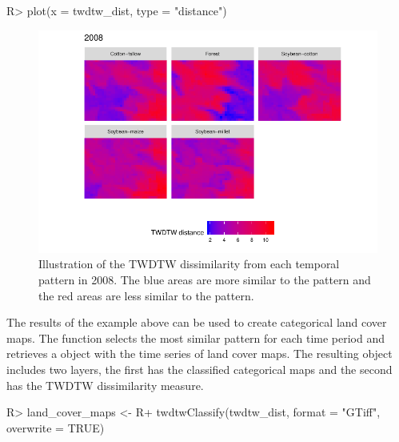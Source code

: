 \documentclass[article,shortnames]{jss}
\begin{document}
\begin{CodeChunk}

\begin{CodeInput}
R> plot(x = twdtw_dist, type = "distance")
\end{CodeInput}
\begin{figure}[!ht]

{\centering \includegraphics{dtwSat_files/figure-latex/plot-dissmilarity2008-1} 

}

\caption[Illustration of the TWDTW dissimilarity from each temporal pattern in 2008]{Illustration of the TWDTW dissimilarity from each temporal pattern in 2008. The blue areas are more similar to the pattern and the red areas are less similar to the pattern.}\label{fig:plot-dissmilarity2008}
\end{figure}
\end{CodeChunk}

The results of the example above can be used to create categorical land
cover maps. The function  selects the most similar
pattern for each time period and retrieves a  object
with the time series of land cover maps. The resulting object includes
two layers, the first has the classified categorical maps and the second
has the TWDTW dissimilarity measure.

\begin{CodeChunk}

\begin{CodeInput}
R> land_cover_maps <- 
R+   twdtwClassify(twdtw_dist, format = "GTiff", overwrite = TRUE)
\end{CodeInput}
\end{CodeChunk}
\end{document}
